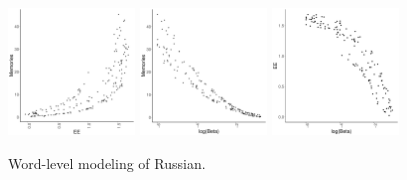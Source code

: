 \documentclass[11pt,letterpaper]{article}
\begin{document}
\begin{figure}
\includegraphics[width=0.3\textwidth]{cryptfig/ru-words-ee-mem.pdf}
\includegraphics[width=0.3\textwidth]{cryptfig/ru-words-logbeta-mem.pdf}
\includegraphics[width=0.3\textwidth]{cryptfig/ru-words-logbeta-ee.pdf}
	\caption{Word-level modeling of Russian.}\label{fig:rug-logbeta}
\end{figure}





\end{document}

